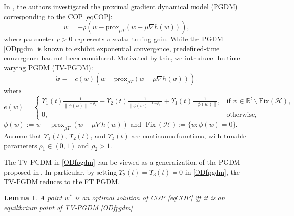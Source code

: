 \documentclass{article}
\theoremstyle{plain}%
\newtheorem{lemma}{Lemma}[section]%
\theoremstyle{thmstyletwo}%
\theoremstyle{thmstylethree}%
\begin{document}
In \cite{28}, the authors investigated the proximal gradient dynamical model (PGDM) corresponding to the COP \eqref{eqCOP}:
\begin{equation}\label{ODpgdm}
\dot{w} = -\rho(w - \text{prox}_{\mu \Upsilon}(w - \mu \nabla h(w))),
\end{equation}
where parameter $\rho > 0$ represents a scalar tuning gain. While the PGDM \eqref{ODpgdm} is known to exhibit exponential convergence, predefined-time convergence has not been considered. Motivated by this, we introduce the time-varying PGDM (TV-PGDM):
\begin{equation}\label{ODfpgdm}
\dot{w} = -e(w)(w - \text{prox}_{\mu \Upsilon}(w - \mu \nabla h(w))),
\end{equation}
where
\[
e(w) = 
\begin{cases}
\Upsilon_1(t) \frac{1}{\|\phi(w)\|^{1-\rho_1}} + \Upsilon_2(t) \frac{1}{\|\phi(w)\|^{1-\rho_2}} + \Upsilon_3(t) \frac{1}{\|\phi(w)\|}, & \text{if } w\in \mathbb{R}^l \backslash \text{Fix}(\mathcal{H}), \\
0, & \text{otherwise},
\end{cases}
\]
$\phi(w):=w -\operatorname{prox}_{\mu\Upsilon}(w -\mu\nabla h(w))$ and 
$\operatorname{Fix}(\mathcal{H}):=\{w:\phi(w)=0\}$. 
Assume that $\Upsilon_1(t)$, $\Upsilon_2(t)$, and $\Upsilon_3(t)$ are continuous functions, with tunable parameters $\rho_1\in(0,1)$ and $\rho_2>1$.


The TV-PGDM in \eqref{ODfpgdm} can be viewed as a generalization of the PGDM proposed in \cite{28}. In particular, by setting $\Upsilon_2(t) = \Upsilon_3(t) = 0$ in \eqref{ODfpgdm}, the TV-PGDM reduces to the FT PGDM.
\begin{lemma}
A point $w^*$ is an optimal solution of COP \eqref{eqCOP} iff it is an equilibrium point of TV-PGDM \eqref{ODfpgdm}
\end{lemma}
\end{document}
